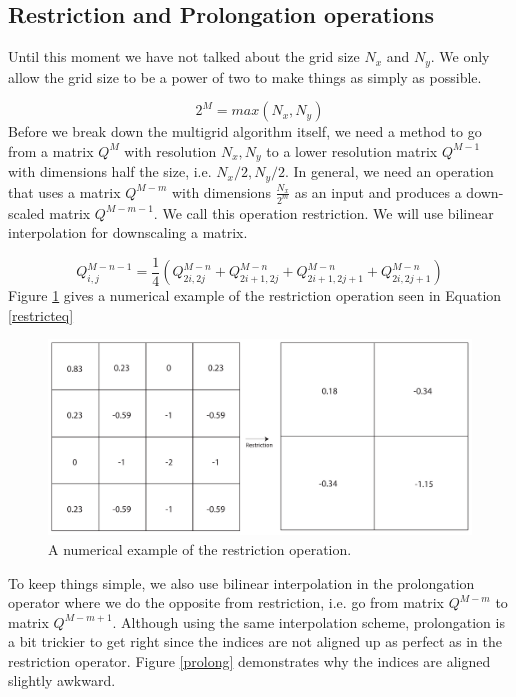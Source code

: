 \subsection{Restriction and Prolongation operations}

Until this moment we have not talked about the grid size $N_x$ and $N_y$.  We only allow the grid size to be a power of two to make things as simply as possible.

\begin{equation}
2^M = max(N_x, N_y)
\end{equation}
\noindent
Before we break down the multigrid algorithm itself, we need a method to go from a matrix $Q^M$ with resolution $N_x,N_y$ to a lower resolution matrix $Q^{M-1}$ with dimensions half the size, i.e. $N_x/2,N_y/2$. In general, we need an operation that uses a matrix $Q^{M-m}$ with dimensions $\frac{N_x}{2^m}$ as an input and produces a down-scaled matrix $Q^{M-m-1}$. We call this operation restriction. We will use bilinear interpolation for downscaling a matrix.

\begin{equation}
Q^{M-n-1}_{i,j} = \frac{1}{4} ( Q^{M-n}_{2i,2j} + Q^{M-n}_{2i + 1,2j} + Q^{M-n}_{2i + 1,2j +1 }  + Q^{M-n}_{2i,2j + 1} )
\label{restricteq}
\end{equation}
\noindent
Figure \ref {restrict} gives a numerical example of the restriction operation seen in Equation \ref{restricteq}
\begin{figure}[ht!]
\centering
\includegraphics[width=120mm]{img/restrict.pdf}
\caption{A numerical example of the restriction operation.}
\label{restrict}
\end{figure}
\newline
\noindent
To keep things simple, we also use bilinear interpolation in the prolongation operator where we do the opposite from restriction, i.e. go from matrix $Q^{M-m}$ to matrix $Q^{M-m+1}$. Although using the same interpolation scheme, prolongation is a bit trickier to get right since the indices are not aligned up as perfect as in the restriction operator. Figure \ref {prolong} demonstrates why the indices are aligned slightly awkward.

